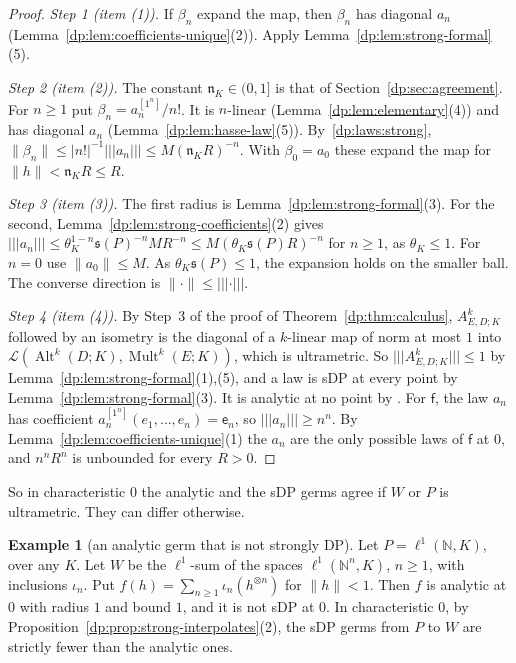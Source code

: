 \documentclass[11pt]{amsart}
\theoremstyle{definition}
\theoremstyle{remark}
\numberwithin{equation}{section}
\newcommand{\N}{\mathbb N}
\newcommand{\cL}{\mathcal L}
\newcommand{\Alt}{\operatorname{Alt}}
\newcommand{\Mult}{\operatorname{Mult}}
\newcommand{\abs}[1]{\lvert #1\rvert}
\newcommand{\norm}[1]{\lVert #1\rVert}
\theoremstyle{plain}
\theoremstyle{definition}
\newtheorem{example}[theorem]{Example}
\theoremstyle{plain}
\begin{document}
\begin{proof}
\emph{Step 1 (item (1)).} If $\beta_n$ expand the map, then $\beta_n$ has diagonal $a_n$ (Lemma~\ref{dp:lem:coefficients-unique}(2)). Apply Lemma~\ref{dp:lem:strong-formal}(5).

\emph{Step 2 (item (2)).} The constant $\mathfrak n_K\in(0,1]$ is that of Section~\ref{dp:sec:agreement}. For $n\ge1$ put $\beta_n=a_n^{[1^n]}/n!$. It is $n$\nobreakdash-linear (Lemma~\ref{dp:lem:elementary}(4)) and has diagonal $a_n$ (Lemma~\ref{dp:lem:hasse-law}(5)). By~\eqref{dp:laws:strong}, $\norm{\beta_n}\le\abs{n!}^{-1}\lvert\!\lvert\!\lvert a_n\rvert\!\rvert\!\rvert\le M(\mathfrak n_KR)^{-n}$. With $\beta_0=a_0$ these expand the map for $\norm h<\mathfrak n_KR\le R$.

\emph{Step 3 (item (3)).} The first radius is Lemma~\ref{dp:lem:strong-formal}(3). For the second, Lemma~\ref{dp:lem:strong-coefficients}(2) gives $\lvert\!\lvert\!\lvert a_n\rvert\!\rvert\!\rvert\le\theta_K^{1-n}\mathfrak s(P)^{-n}MR^{-n}\le M(\theta_K\mathfrak s(P)R)^{-n}$ for $n\ge1$, as $\theta_K\le1$. For $n=0$ use $\norm{a_0}\le M$. As $\theta_K\mathfrak s(P)\le1$, the expansion holds on the smaller ball. The converse direction is $\norm\cdot\le\lvert\!\lvert\!\lvert \cdot\rvert\!\rvert\!\rvert$.

\emph{Step 4 (item (4)).} By Step~3 of the proof of Theorem~\ref{dp:thm:calculus}, $A^k_{E,D;K}$ followed by an isometry is the diagonal of a $k$\nobreakdash-linear map of norm at most $1$ into $\cL(\Alt^k(D;K),\Mult^k(E;K))$, which is ultrametric. So $\lvert\!\lvert\!\lvert A^k_{E,D;K}\rvert\!\rvert\!\rvert\le1$ by Lemma~\ref{dp:lem:strong-formal}(1),(5), and a law is sDP at every point by Lemma~\ref{dp:lem:strong-formal}(3). It is analytic at no point by \cite[Theorem~7.2(2)]{I}. For $\mathsf f$, the law $a_n$ has coefficient $a_n^{[1^n]}(e_1,\dots,e_n)=\mathsf e_n$, so $\lvert\!\lvert\!\lvert a_n\rvert\!\rvert\!\rvert\ge n^n$. By Lemma~\ref{dp:lem:coefficients-unique}(1) the $a_n$ are the only possible laws of $\mathsf f$ at $0$, and $n^nR^n$ is unbounded for every $R>0$.
\end{proof}

So in characteristic $0$ the analytic and the sDP germs agree if $W$ or $P$ is ultrametric. They can differ otherwise.

\begin{example}[an analytic germ that is not strongly DP]\label{dp:ex:an-not-sdp}
Let $P=\ell^1(\N,K)$, over any $K$. Let $W$ be the $\ell^1$-sum of the spaces $\ell^1(\N^n,K)$, $n\ge1$, with inclusions $\iota_n$. Put $f(h)=\sum_{n\ge1}\iota_n(h^{\otimes n})$ for $\norm h<1$. Then $f$ is analytic at $0$ with radius $1$ and bound $1$, and it is not sDP at $0$. In characteristic $0$, by Proposition~\ref{dp:prop:strong-interpolates}(2), the sDP germs from $P$ to $W$ are strictly fewer than the analytic ones.
\end{example}
\end{document}
